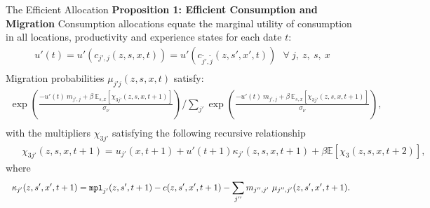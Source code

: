 \documentclass[9pt,pdftex,aspectratio=1610]{beamer}
\theoremstyle{definition}
\begin{document}

\begin{frame}[t]{The Efficient Allocation}
\textbf{Proposition 1: Efficient Consumption and Migration} Consumption allocations equate the marginal utility of consumption in all locations, productivity and experience states for each date $t$:
\vspace{0.15cm}
{\small
\begin{align}
u'(t) = u'(c_{j',j}(z, s, x, t)) = u'(c_{\tilde{j'},\tilde{j}}(z, s', x', t)) \ \ \ \forall \ j, \ z , \ s, \ x  \nonumber \\[.75em] \nonumber
\end{align}
}
Migration probabilities  $\mu_{j'j}(z,s,x,t)$ satisfy:
\vspace{0.25cm}
{\small
\begin{align}
\exp \left(\frac{- u'(t) \ m_{j',j} + \beta \ \mathbb{E}_{s,x}\left[\chi_{3j'}(z,s,x, t+1)\right]}{\sigma_{\nu}} \right)  \Bigg / \sum_{j'} \exp \left( \frac{- u'(t)\ m_{j',j} + \beta \  \mathbb{E}_{s,x}\left[\chi_{3j'}(z,s,x, t+1) \right]}{\sigma_{\nu}} \right), \nonumber \\[.75em] \nonumber
\end{align}
}
with the multipliers $\chi_{3j'}$ satisfying the following recursive relationship
\vspace{0.15cm}
{\small
\begin{align}
& \ \ \chi_{3j'}(z, s, x, t+1) =  u_{j'}(x, t+1) +  u'(t+1) \kappa_{j'}(z, s,x,t+1) + \beta \mathbb{E}\left[\chi_{3}(z,s,x, t+2) \right], \nonumber
\end{align}}
where
\vspace{0.15cm}
{\small
\begin{align}
& \ \ \kappa_{j'}(z, s',x',t+1) = \mbox{\texttt{mpl}}_{j'}(z,s',t+1) - c(z, s',x',t+1) - \sum_{j''}  m_{j'',j'} \ \mu_{j'',j'}(z, s', x', t+1). \nonumber
\end{align}}
\end{frame}

\end{document}
